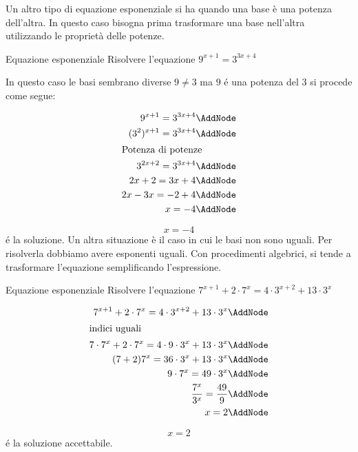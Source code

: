 Un altro tipo di equazione esponenziale si ha quando una base è una potenza dell'altra. In questo caso bisogna prima trasformare una base nell'altra utilizzando le proprietà delle potenze.
\begin{esempiot}{Equazione esponenziale}{}
	Risolvere l'equazione $9^{x+1}=3^{3x+4}$
\end{esempiot}
	In questo caso le basi sembrano diverse $9\neq 3$ ma $9$ \'{e} una potenza del $3$ si procede come segue:
	\begin{NodesList}[margin=4cm]
		\begin{align*}
			9^{x+1}=3^{3x+4}\AddNode\\
			(3^2)^{x+1}=3^{3x+4}\AddNode\\
			\intertext{\hfil Potenza di potenze}
			3^{2x+2}=3^{3x+4}\AddNode\\
			2x+2=3x+4\AddNode\\
			2x-3x=-2+4\AddNode\\
			x=-4\AddNode
		\end{align*}
		\LinkNodes{}%
	\end{NodesList}
	\[x=-4\]
	\'{e} la soluzione.
Un altra situazione è il caso in cui le basi non sono uguali. Per risolverla dobbiamo avere esponenti uguali. Con procedimenti algebrici, si tende a trasformare l'equazione semplificando l'espressione. 
\begin{esempiot}{Equazione esponenziale}{}
	Risolvere l'equazione $7^{x+1}+2\cdot7^{x}=4\cdot3^{x+2}+13\cdot 3^x$
\end{esempiot}
	\begin{NodesList} [margin=4cm]
		\begin{align*}
			7^{x+1}+2\cdot7^{x}=4\cdot3^{x+2}+13\cdot 3^x\AddNode\\
			\intertext{\hfil indici uguali}
			7\cdot7^x+2\cdot7^x=4\cdot9\cdot3^x+13\cdot3^x\AddNode\\
			(7+2)7^x=36\cdot3^x+13\cdot3^x\AddNode\\
			9\cdot7^x=49\cdot3^x\AddNode\\
			\dfrac{7^x}{3^x}=\dfrac{49}{9}\AddNode\\
			x=2\AddNode
		\end{align*}
	\end{NodesList}
	\[x=2\]
	\'{e} la soluzione accettabile.
